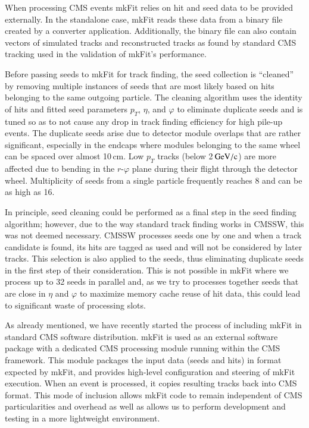 \documentclass{webofc}
\def\mkfit{mkFit\xspace}
\def\GeVoc{\ensuremath{\,\rm{G}e\rm{V}/c}}
\begin{document}
When processing CMS events \mkfit relies on hit and seed data to be provided
externally. In the standalone case, \mkfit reads these data from a binary file
created by a converter application. Additionally, the binary file can also 
contain vectors of simulated tracks and reconstructed tracks as found by 
standard CMS tracking used in the validation of \mkfit's performance.

Before passing seeds to \mkfit for track finding, the seed collection is
``cleaned'' by removing multiple instances of seeds that are most likely 
based on hits belonging to the same outgoing particle. The cleaning
algorithm uses the identity of hits and fitted seed parameters $p_T$, $\eta$,
and $\varphi$ to eliminate duplicate seeds and is tuned so as to not cause any
drop in track finding efficiency for high pile-up events. The duplicate seeds
arise due to detector module overlaps that are rather significant, especially
in the endcaps where modules belonging to the same wheel can be spaced over
almost 10\,cm. Low $p_T$ tracks (below 2\GeVoc) are more affected due to
bending in the $r$-$\varphi$ plane during their flight through the detector
wheel. Multiplicity of seeds from a single particle frequently reaches 8 and
can be as high as 16.

In principle, seed cleaning could be performed as a final step in the seed
finding algorithm; however, due to the way standard track finding works in
CMSSW, this was not deemed necessary. CMSSW processes seeds one by one and
when a track candidate is found, its hits are tagged as used and will not be
considered by later tracks. This selection is also applied to the seeds, thus
eliminating duplicate seeds in the first step of their consideration. This is
not possible in \mkfit where we process up to 32 seeds in parallel and, as we
try to processes together seeds that are close in $\eta$ and $\varphi$ to
maximize memory cache reuse of hit data, this could lead to significant waste
of processing slots.

As already mentioned, we have recently started the process of including \mkfit
in standard CMS software distribution. \mkfit is used as an external software
package with a dedicated CMS processing module running within the CMS
framework. This module packages the input data (seeds and hits) in format
expected by \mkfit, and provides high-level configuration and steering of
\mkfit execution. When an event is processed, it copies resulting tracks back
into CMS format. This mode of inclusion allows \mkfit code to remain
independent of CMS particularities and overhead as well as allows us to
perform development and testing in a more lightweight environment.
\end{document}
